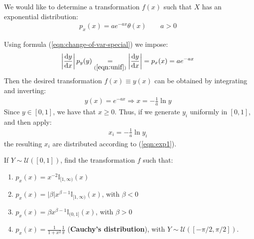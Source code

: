 \documentclass[../../main.tex]{subfiles}
\begin{document}
We would like to determine a transformation $f(x)$ such that $X$ has an exponential distribution:
\begin{align}\label{eqn:exp1}
    p_x(x) = a e^{-a x} \theta(x) \qquad a > 0
\end{align} 

Using formula (\ref{eqn:change-of-var-special}) we impose:
\begin{align*}
    \left| \dv{y}{x} \right| p_y(y) \underset{(\ref{eqn:unif})}{=} \left|\dv{y}{x} \right| = p_x(x) = a e^{-ax}
\end{align*}
Then the desired transformation $f(x) \equiv y(x)$ can be obtained by integrating and inverting:
\begin{align*}
    y(x) = e^{-ax} \Rightarrow x=-\frac{1}{a} \ln y 
\end{align*}
Since $y \in [0,1]$, we have that $x \geq 0$. Thus, if we generate $y_i$ uniformly in $[0,1]$, and then apply:
\begin{align*}
    x_i = -\frac{1}{a}  \ln y_i
\end{align*}
the resulting $x_i$ are distributed according to (\ref{eqn:exp1}).

\begin{exo}
    If $Y \sim \mathcal{U}([0,1])$, find the transformation $f$ such that:
    \begin{enumerate}[label=\alph*.]
        \item $p_x(x) = x^{-2} \mathbb{I}_{[1,\infty)}(x)$
        \item $p_x(x) = |\beta| x^{\beta-1} \mathbb{I}_{[1, \infty)}(x)$, with $\beta < 0$
        \item $p_x(x) = \beta x^{\beta-1} \mathbb{I}_{(0,1]}(x)$, with $\beta > 0$
        \item $\displaystyle p_x(x) = \frac{1}{1+x^2} \frac{1}{\pi}$ (\textbf{Cauchy's distribution}), with $Y \sim \mathcal{U}([-\pi/2, \pi/2])$.  
    \end{enumerate}
    
\end{exo}
\end{document}
